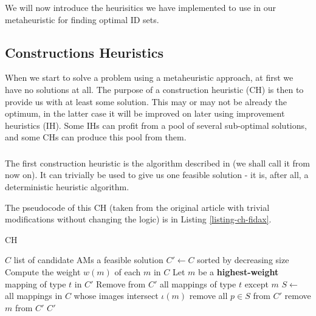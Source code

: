 We will now introduce the heurisitics we have implemented to use in our metaheuristic for finding optimal ID sets.

\subsection{Constructions Heuristics}
\label{section-mip-chs}

When we start to solve a problem using a metaheuristic approach, at first we have no solutions at all. The purpose of a construction heuristic (CH) is then to provide us with at least some solution. This may or may not be already the optimum, in the latter case it will be improved on later using improvement heuristics (IH). Some IHs can profit from a pool of several sub-optimal solutions, and some CHs can produce this pool from them.

\subsubsection{}
\label{section-mip-fidax}

The first construction heuristic is the algorithm described in \cite{fidax} (we shall call it  from now on). It can trivially be used to give us one feasible solution - it is, after all, a deterministic heuristic algorithm.

The pseudocode of this CH (taken from the original article with trivial modifications without changing the logic) is in Listing \ref{listing-ch-fidax}.

\begin{algorithm}
\caption{ CH}
\label{listing-ch-fidax}
\begin{algorithmic}
\REQUIRE $C$ list of candidate AMs
\ENSURE a feasible solution
\STATE $C' \gets C$ sorted by decreasing size
\STATE Compute the weight $w(m)$ of each $m$ in $C$
  \STATE Let $m$ be a \textbf{highest-weight} mapping of type $t$ in $C'$
  \STATE Remove from $C'$ all mappings of type $t$ except $m$
\ENDFOR
{}
  \STATE $S \gets$ all mappings in $C$ whose images intersect $\iota(m)$
    \STATE remove all $p \in S$ from $C'$
  \ELSE
    \STATE remove $m$ from $C'$
  \ENDIF
\ENDFOR
\RETURN $C'$
\end{algorithmic}
\end{algorithm}

\subsubsection{}
\label{heu-ch-random}

